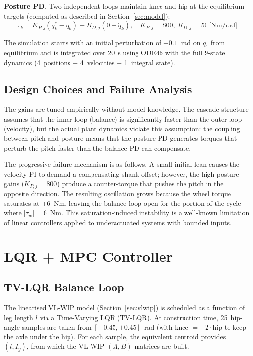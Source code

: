 \documentclass[11pt,a4paper]{article}
\begin{document}
\textbf{Posture PD.}  Two independent loops maintain knee and hip at the equilibrium
targets (computed as described in Section~\ref{sec:model}):
\begin{equation}
    \tau_k = K_{P,j}(q_k^* - q_k) + K_{D,j}(0 - \dot{q}_k),
    \quad K_{P,j} = 800,\ K_{D,j} = 50\ \text{[Nm/rad]}
\end{equation}

The simulation starts with an initial perturbation of $-0.1$~rad on $q_1$ from equilibrium
and is integrated over 20~s using ODE45 with the full 9-state dynamics (4~positions + 4~velocities + 1~integral state).

\subsection{Design Choices and Failure Analysis}

The gains are tuned empirically without model knowledge.  The cascade structure assumes that
the inner loop (balance) is significantly faster than the outer loop (velocity), but the
actual plant dynamics violate this assumption: the coupling between pitch and posture means
that the posture PD generates torques that perturb the pitch faster than the balance PD can
compensate.

The progressive failure mechanism is as follows.  A small initial lean causes the velocity
PI to demand a compensating shank offset; however, the high posture gains
($K_{P,j} = 800$) produce a counter-torque that pushes the pitch in the opposite direction.
The resulting oscillation grows because the wheel torque saturates at $\pm 6$~Nm, leaving
the balance loop open for the portion of the cycle where $|\tau_w| = 6$~Nm.  This
saturation-induced instability is a well-known limitation of linear controllers applied to
underactuated systems with bounded inputs.


\section{LQR + MPC Controller}
\label{sec:lqr_mpc}

\subsection{TV-LQR Balance Loop}

The linearised VL-WIP model (Section~\ref{sec:vlwip}) is scheduled as a function of leg
length $l$ via a Time-Varying LQR (TV-LQR).  At construction time, 25~hip-angle samples
are taken from $[-0.45, +0.45]$~rad (with knee $= -2\cdot\text{hip}$ to keep the axle
under the hip).  For each sample, the equivalent centroid provides $(l, I_y)$, from which
the VL-WIP $(A,B)$ matrices are built.
\end{document}
